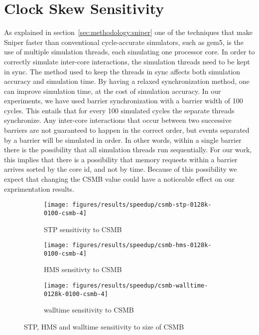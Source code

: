 
\section{Clock Skew Sensitivity}
\label{sec:results:csmb_sensitivity}

As explained in section~\ref{sec:methodology:sniper} one of the techniques that make Sniper faster than conventional cycle-accurate simulators, such as gem5, is the use of multiple simulation threads, each simulating one processor core.
In order to correctly simulate inter-core interactions, the simulation threads need to be kept in sync.
The method used to keep the threads in sync affects both simulation accuracy and simulation time.
By having a relaxed synchronization method, one can improve simulation time, at the cost of simulation accuracy.
In our experiments, we have used barrier synchronization with a barrier width of 100 cycles.
This entails that for every 100 simulated cycles the separate threads synchronize.
Any inter-core interactions that occur between two successive barriers are not guaranteed to happen in the correct order, but events separated by a barrier will be simulated in order.
In other words, within a single barrier there is the possibility that all simulation threads run sequentially.
For our work, this implies that there is a possibility that memory requests within a barrier arrives sorted by the core id, and not by time.
Because of this possibility we expect that changing the CSMB value could have a noticeable effect on our exprimentation results.

\begin{figure}
    \centering
    \begin{subfigure}[b]{0.5\textwidth}
        \texttt{[image: figures/results/speedup/csmb-stp-0128k-0100-csmb-4]}
        \caption{STP sensitivity to CSMB}
        \label{fig:results:csmb:stp}
    \end{subfigure}%
    \begin{subfigure}[b]{0.5\textwidth}
        \texttt{[image: figures/results/speedup/csmb-hms-0128k-0100-csmb-4]}
        \caption{HMS sensitivty to CSMB}
        \label{fig:results:csmb:hms}
    \end{subfigure}
    \begin{subfigure}[b]{0.6\textwidth}
        \texttt{[image: figures/results/speedup/csmb-walltime-0128k-0100-csmb-4]}
        \caption{walltime sensitivity to CSMB}
        \label{fig:results:csmb:mpki}
    \end{subfigure}
    \caption{STP, HMS and walltime sensitivity to size of CSMB}
    \label{fig:results:csmb}
\end{figure}


